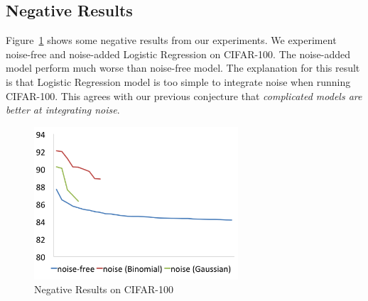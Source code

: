 \subsection{Negative Results}
Figure~\ref{neg} shows some negative results from our experiments.
We experiment noise-free and noise-added Logistic Regression on CIFAR-100.
The noise-added model perform much worse than noise-free model. The
explanation for this result is that Logistic Regression model is too
simple to integrate noise when running CIFAR-100. This agrees with our
previous conjecture that {\em complicated models are better at integrating
noise}.
\begin{figure}[!htbp]
\centering
\includegraphics[width=215pt]{f-figs/neg.png}
\caption{Negative Results on CIFAR-100}
\label{neg}
\end{figure}
